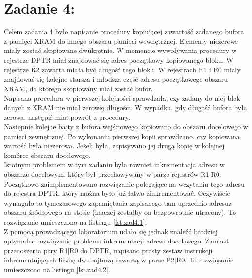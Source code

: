 \documentclass[a4paper,12pt]{article}
\begin{document}
\section{Zadanie 4:}
Celem zadania 4 było napisanie procedury kopiującej zawartość zadanego bufora z pamięci XRAM do innego obszaru pamięci wewnętrznej. Elementy niezerowe miały zostać skopiowane dwukrotnie. W momencie wywoływania procedury w rejestrze DPTR miał znajdować się adres początkowy kopiowanego bloku. W rejestrze R2 zawarta miała być długość tego bloku. W rejestrach R1 i R0 miały znajdować się kolejno starsza i młodsza część adresu początkowego obszaru XRAM, do którego skopiowany miał zostać bufor.\\

\noindent
Napisana procedura w pierwszej kolejności sprawdzała, czy zadany do niej blok danych z XRAM nie miał zerowej długości. W wypadku, gdy długość bufora była zerowa, nastąpić miał powrót z procedury.\\

\noindent
Następnie kolejne bajty z bufora wejściowego kopiowano do obszaru docelowego w pamięci zewnętrznej. Po wykonaniu pierwszej kopii sprawdzano, czy kopiowana wartość była niezerowa. Jeżeli była,  zapisywano jej drugą kopię w kolejnej komórce obszaru docelowego.\\

\noindent
Istotnym problemem w tym zadaniu była również inkrementacja adresu w obszarze docelowym, który był przechowywany w parze rejestrów R1$\vert$R0. Początkowo zaimplementowano rozwiązanie polegające na wczytaniu tego adresu do rejestru DPTR, który można było już łatwo zinkrementować. Oczywiście wymagało to tymczasowego zapamiętania zapisanego tam uprzednio adresuz obszaru źródłowego na stosie (inaczej zostałby on bezpowrotnie utracony). To rozwiązanie umieszczono na listingu \ref{lst.zad4.1}.\\

\noindent
Z pomocą prowadzącego laboratorium udało się jednak znaleźć bardziej optymalne rozwiązanie problemu inkrementacji adresu docelowego. Zamiast przenoszenia pary R1$\vert$R0 do DPTR, napisano prosty zestaw instrukcji inkrementujących liczbę dwubajtową zawartą w parze P2$\vert$R0. To rozwiązanie umieszczono na listingu \ref{lst.zad4.2}.
\end{document}
